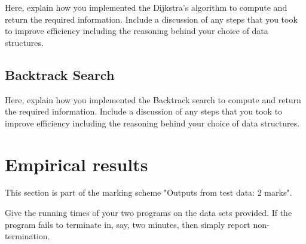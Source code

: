 \documentclass{article}
\begin{document}
Here, explain how you implemented the Dijkstra's algorithm to compute and return the required information. Include a discussion of any steps that you took to improve efficiency including the reasoning behind your choice of data structures.

\subsection*{Backtrack Search}

Here, explain how you implemented the Backtrack search to compute and return the required information. Include a discussion of any steps that you took to improve efficiency including the reasoning behind your choice of data structures.

\section*{Empirical results}

This section is part of the marking scheme "Outputs from test data: 2 marks".

Give the running times of your two programs on the data sets provided. If the program fails to terminate in, say, two minutes, then simply report non-termination. 
\end{document}
